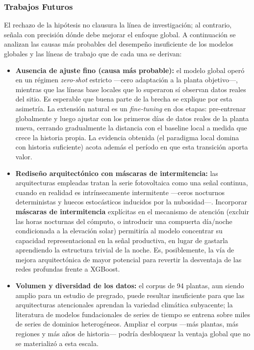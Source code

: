\subsubsection{Trabajos Futuros}

El rechazo de la hipótesis no clausura la línea de investigación; al contrario, señala con precisión dónde debe mejorar el enfoque global. A continuación se analizan las causas más probables del desempeño insuficiente de los modelos globales y las líneas de trabajo que de cada una se derivan:

\begin{itemize}
    \item \textbf{Ausencia de ajuste fino (causa más probable):} el modelo global operó en un régimen \textit{zero-shot} estricto —cero adaptación a la planta objetivo—, mientras que las líneas base locales que lo superaron sí observan datos reales del sitio. Es esperable que buena parte de la brecha se explique por esta asimetría. La extensión natural es un \textit{fine-tuning} en dos etapas: pre-entrenar globalmente y luego ajustar con los primeros días de datos reales de la planta nueva, cerrando gradualmente la distancia con el baseline local a medida que crece la historia propia. La evidencia obtenida (el paradigma local domina con historia suficiente) acota además el período en que esta transición aporta valor.
    \item \textbf{Rediseño arquitectónico con máscaras de intermitencia:} las arquitecturas empleadas tratan la serie fotovoltaica como una señal continua, cuando en realidad es intrínsecamente intermitente —ceros nocturnos deterministas y huecos estocásticos inducidos por la nubosidad—. Incorporar \textbf{máscaras de intermitencia} explícitas en el mecanismo de atención (excluir las horas nocturnas del cómputo, o introducir una compuerta día/noche condicionada a la elevación solar) permitiría al modelo concentrar su capacidad representacional en la señal productiva, en lugar de gastarla aprendiendo la estructura trivial de la noche. Es, posiblemente, la vía de mejora arquitectónica de mayor potencial para revertir la desventaja de las redes profundas frente a XGBoost.
    \item \textbf{Volumen y diversidad de los datos:} el corpus de 94 plantas, aun siendo amplio para un estudio de pregrado, puede resultar insuficiente para que las arquitecturas atencionales aprendan la variedad climática subyacente; la literatura de modelos fundacionales de series de tiempo se entrena sobre miles de series de dominios heterogéneos. Ampliar el corpus —más plantas, más regiones y más años de historia— podría desbloquear la ventaja global que no se materializó a esta escala.

\end{itemize}
